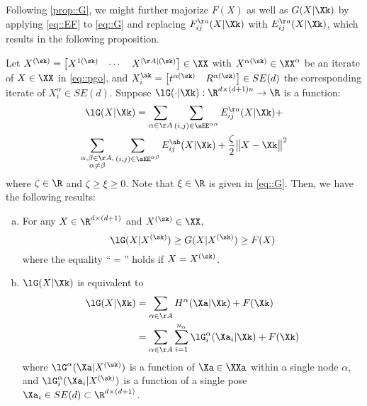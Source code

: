 Following \cref{prop::G}, we might further majorize $F(X)$ as well as $G(X|\Xk)$ by applying \cref{eq::EF} to \cref{eq::G} and replacing $F_{ij}^{\aa}(X|\Xk)$ with $E_{ij}^{\aa}(X|\Xk)$, which results in the following proposition.

\begin{prop}\label{prop::lG}
Let $X^{(\sk)}=\begin{bmatrix}
	X^{1(\sk)} & \cdots & X^{|\AA|(\sk)}
\end{bmatrix}\in \XX$ with $X^{\alpha(\sk)}\in \XX^\alpha$ be an iterate of $X\in \XX$ in \cref{eq::pgo}, and $X_i^{\ak}=\begin{bmatrix}
t^{\alpha(\sk)} & R^{\alpha(\sk)}
\end{bmatrix}\in SE(d)$ the corresponding iterate of $X_i^\alpha \in  SE(d)$. Suppose $\lG(\cdot|\Xk): \R^{d\times(d+1)n}\rightarrow\R$ is a function:
\vspace{-0.25em}
\begin{multline}\label{eq::lG}
\lG(X|\Xk)= \sum_{\alpha\in\AA}\sum_{(i,j)\in \aEE^{\alpha\alpha}}E_{ij}^{\aa}(X|\Xk)+\\
\sum_{\substack{\alpha,\beta\in\AA,\\
		\alpha\neq \beta}}\sum_{(i,j)\in \aEE^{\alpha\beta}} E_{ij}^{\ab}(X|\Xk) + \frac{\zeta}{2} \big\|X-\Xk\big\|^2
\end{multline}
where $\zeta\in\R$ and $\zeta\geq\xi\geq 0$. Note that $\xi\in \R$ is given in \cref{eq::G}. Then,  we have the following results:
{\highlight
\begin{enumerate}[(a)]
	\item\label{prop::lG1}  For any $X\in\R^{d\times(d+1)}$ and $X^{(\sk)}\in\XX$, 	
	\begin{equation}\label{eq::lGF}
		\lG (X|X^{(\sk)})\geq G(X|X^{(\sk)})\geq F(X)
	\end{equation}
	where the equality ``$=$'' holds if  $X=X^{(\sk)}$.
	\item\label{prop::lG2} $\lG(X|\Xk)$ is equivalent to
	\begin{equation}\label{eq::lG2}
		\begin{aligned}
			\lG(X|\Xk)&=\sum_{\alpha\in\AA} H^{\alpha}(\Xa|\Xk)  + F(\Xk)\\
							&=\sum_{\alpha\in\AA}\sum_{i=1}^{n_\alpha} \lG_i^{\alpha}(\Xa_i|\Xk) + F(\Xk)
		\end{aligned}
	\end{equation}
	where $\lG^\alpha(\Xa|X^{(\sk)})$ is a function of $\Xa\in\XXa$ within a single node $\alpha$, and  $\lG_i^\alpha(\Xa_i|X^{(\sk)})$ is a  function of a single pose $\Xa_i\in SE(d)\subset \R^{d\times (d+1)}$. 
	

\end{enumerate}}
\end{prop}
